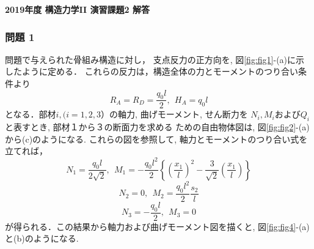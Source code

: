 \documentclass[10pt,a4j]{jarticle}
\newlength{\minitwocolumn}
\begin{document}
\newcommand{\fat}[1]{\mbox{\boldmath $#1$}}
\newcommand{\D}{\partial}
\newcommand{\w}{\omega}
\newcommand{\ga}{\alpha}
\newcommand{\gb}{\beta}
\newcommand{\gx}{\xi}
\newcommand{\gz}{\zeta}
\newcommand{\vhat}[1]{\hat{\fat{#1}}}
\newcommand{\spc}{\vspace{0.7\baselineskip}}
\newcommand{\halfspc}{\vspace{0.3\baselineskip}}

\pagestyle{empty}
\newcommand{\twofig}[2]
 {
   \begin{figure}[h]
     \begin{minipage}[t]{\minitwocolumn}
         \begin{center}   #1
         \end{center}
     \end{minipage}
         \hspace{\columnsep}
     \begin{minipage}[t]{\minitwocolumn}
         \begin{center} #2
         \end{center}
     \end{minipage}
   \end{figure}
 }
\begin{center}
	{\Large \bf 2019年度 構造力学II 演習課題2 解答} \\
\end{center}
\subsubsection*{問題 1}
	問題で与えられた骨組み構造に対し，
	支点反力の正方向を, 図\ref{fig:fig1}-(a)に示したように定める．
	これらの反力は，構造全体の力とモーメントのつり合い条件より
	\[
		R_A=R_D=\frac{q_0l}{2}, \ \ H_A=q_0l
	\]
	となる．部材$i, (i=1,2,3）$の軸力, 曲げモーメント, せん断力を
	$N_i, M_i$および$Q_i$と表すとき, 部材１から３の断面力を求める
	ための自由物体図は, 図\ref{fig:fig2}-(a)から(c)のようになる.
	これらの図を参照して, 軸力とモーメントのつり合い式を立てれば，
	\[
		N_1=\frac{q_0l}{2\sqrt{2}}, \ \ 
		M_1=-\frac{q_0l^2}{2}
			\left\{\left(\frac{x_1}{l}\right)^2
			-\frac{3}{\sqrt{2}}\left(\frac{x_1}{l}\right)\right\}
	\]
	\[
		N_2=0, \ \ 
		M_2=\frac{q_0l^2}{2}\frac{s_2}{l}	
	\]
	\[
		N_3=-\frac{q_0l}{2}, \ \ 
		M_3=0
	\]
	が得られる．この結果から軸力および曲げモーメント図を描くと, 図\ref{fig:fig4}-(a)と(b)のようになる.
\end{document}
